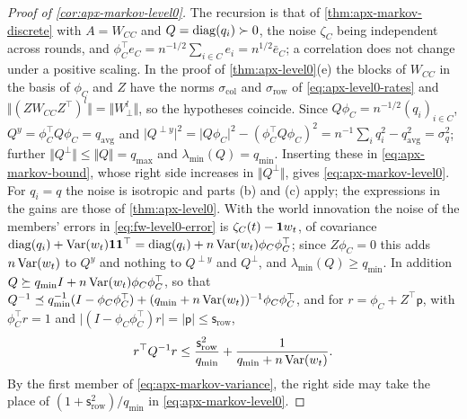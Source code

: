 \begin{proof}[Proof of \cref{cor:apx-markov-level0}]
The recursion is that of \cref{thm:apx-markov-discrete} with $A=W_{CC}$ and $Q=\operatorname{diag}(q_i)\succ0$, the noise $\zeta_C$ being independent across rounds, and $\phi_C^\top e_C=n^{-1/2}\sum_{i\in C}e_i=n^{1/2}\bar e_C$; a correlation does not change under a positive scaling. In the proof of \cref{thm:apx-level0}(e) the blocks of $W_{CC}$ in the basis of $\phi_C$ and $Z$ have the norms $\sigma_{\mathrm{col}}$ and $\sigma_{\mathrm{row}}$ of \eqref{eq:apx-level0-rates} and $\Vert(ZW_{CC}Z^\top)^l\Vert=\Vert W_\perp^l\Vert$, so the hypotheses coincide. Since $Q\phi_C=n^{-1/2}(q_i)_{i\in C}$, $Q^y=\phi_C^\top Q\phi_C=q_{\mathrm{avg}}$ and $\lvert Q^{\perp y}\rvert^2=\lvert Q\phi_C\rvert^2-(\phi_C^\top Q\phi_C)^2=n^{-1}\sum_iq_i^2-q_{\mathrm{avg}}^2=\sigma_q^2$; further $\Vert Q^\perp\Vert\le\Vert Q\Vert=q_{\max}$ and $\lambda_{\min}(Q)=q_{\min}$. Inserting these in \eqref{eq:apx-markov-bound}, whose right side increases in $\Vert Q^\perp\Vert$, gives \eqref{eq:apx-markov-level0}. For $q_i=q$ the noise is isotropic and parts (b) and (c) apply; the expressions in the gains are those of \cref{thm:apx-level0}. With the world innovation the noise of the members' errors in \eqref{eq:fw-level0-error} is $\zeta_C(t)-\mathbf{1} w_t$, of covariance $\operatorname{diag}(q_i)+\operatorname{Var}(w_t)\mathbf{1}\mathbf{1}^\top=\operatorname{diag}(q_i)+n\operatorname{Var}(w_t)\phi_C\phi_C^\top$; since $Z\phi_C=0$ this adds $n\operatorname{Var}(w_t)$ to $Q^y$ and nothing to $Q^{\perp y}$ and $Q^\perp$, and $\lambda_{\min}(Q)\ge q_{\min}$. In addition $Q\succeq q_{\min}I+n\operatorname{Var}(w_t)\phi_C\phi_C^\top$, so that $Q^{-1}\preceq q_{\min}^{-1}(I-\phi_C\phi_C^\top)+(q_{\min}+n\operatorname{Var}(w_t))^{-1}\phi_C\phi_C^\top$, and for $r=\phi_C+Z^\top\mathsf p$, with $\phi_C^\top r=1$ and $\lvert(I-\phi_C\phi_C^\top)r\rvert=\lvert\mathsf p\rvert\le\mathsf s_{\mathrm{row}}$,
\begin{equation*}
r^\top Q^{-1}r\le\frac{\mathsf s_{\mathrm{row}}^2}{q_{\min}}+\frac1{q_{\min}+n\operatorname{Var}(w_t)} .
\end{equation*}
By the first member of \eqref{eq:apx-markov-variance}, the right side may take the place of $(1+\mathsf s_{\mathrm{row}}^2)/q_{\min}$ in \eqref{eq:apx-markov-level0}.
\end{proof}

